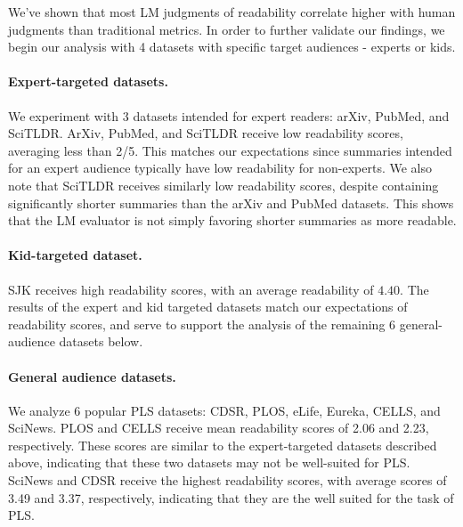 

We've shown that most LM judgments of readability correlate higher with human judgments than traditional metrics. In order to further validate our findings, we begin our analysis with 4 datasets with specific target audiences - experts or kids. 

\paragraph{Expert-targeted datasets.} We experiment with 3 datasets intended for expert readers: arXiv, PubMed, and SciTLDR. ArXiv, PubMed, and SciTLDR receive low readability scores, averaging less than 2/5. This matches our expectations since summaries intended for an expert audience typically have low readability for non-experts. We also note that SciTLDR receives similarly low readability scores, despite containing significantly shorter summaries than the arXiv and PubMed datasets. This shows that the LM evaluator is not simply favoring shorter summaries as more readable. 

\paragraph{Kid-targeted dataset.} SJK receives high readability scores, with an average readability of $4.40$. The results of the expert and kid targeted datasets match our expectations of readability scores, and serve to support the analysis of the remaining 6 general-audience datasets below.

\paragraph{General audience datasets.} We analyze 6 popular PLS datasets: CDSR, PLOS, eLife, Eureka, CELLS, and SciNews. PLOS and CELLS receive mean readability scores of 2.06 and 2.23, respectively. These scores are similar to the expert-targeted datasets described above, indicating that these two datasets may not be well-suited for PLS. SciNews and CDSR receive the highest readability scores, with average scores of 3.49 and 3.37, respectively, indicating that they are the well suited for the task of PLS. 


